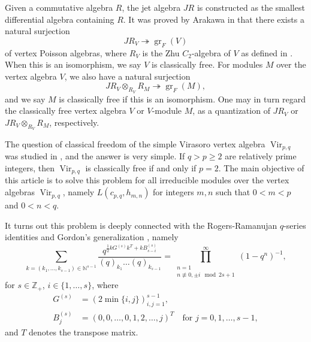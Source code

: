 \documentclass[a4paper, 12pt, reqno]{amsart}
\theoremstyle{remark}
\DeclareMathOperator{\Vir}{Vir}
\DeclareMathOperator{\gr}{gr}
\begin{document}
Given a commutative algebra $R$, the jet algebra $JR$ is constructed as the smallest differential algebra containing $R$.
It was proved by Arakawa in \cite[Proposition 2.5.1]{arakawa_remark_2012} that there exists a natural surjection
\begin{equation*}
  JR_V \twoheadrightarrow \gr_F(V)
\end{equation*}
of vertex Poisson algebras, where $R_V$ is the Zhu $C_2$-algebra of $V$ as defined in \cite{zhu_modular_1996}.
When this is an isomorphism, we say $V$ is classically free.
For modules $M$ over the vertex algebra $V$, we also have a natural surjection
\begin{equation*}
  JR_V \otimes_{R_V} R_M \twoheadrightarrow \gr_F(M),
\end{equation*}
and we say $M$ is classically free if this is an isomorphism.
One may in turn regard the classically free vertex algebra $V$ or $V$-module $M$, as a quantization of $JR_V$ or $JR_V \otimes_{R_V} R_M$, respectively.

The question of classical freedom of the simple Virasoro vertex algebra $\Vir_{p, q}$ was studied in \cite{van_ekeren_chiral_2021}, and the answer is very simple.
If $q > p \ge 2$ are relatively prime integers, then $\Vir_{p, q}$ is classically free if and only if $p = 2$.
The main objective of this article is to solve this problem for all irreducible modules over the vertex algebras $\Vir_{p, q}$, namely $L(c_{p, q}, h_{m, n})$ for integers $m, n$ such that $0 < m < p$ and $0 < n < q$.

It turns out this problem is deeply connected with the Rogers-Ramanujan $q$-series identities and Gordon's generalization \cite{gordon_combinatorial_1961}, namely
\begin{equation}
  \label{eq:1}
  \sum_{k = (k_1, \dots, k_{s - 1}) \in \mathbb{N}^{s - 1}}  \frac{q^{\frac{1}{2}kG^{(s)}k^T + kB^{(s)}_{s - i}}}{(q)_{k_1}\dots(q)_{k_{s - 1}}} = \prod^{\infty}_{\substack{n = 1 \\ n \not\equiv 0, \pm i \mod 2s + 1}}(1 - q^n)^{-1},
\end{equation}
for $s \in \mathbb{Z}_+$, $i \in \{1, \dots, s\}$, where
\begin{align*}
  G^{(s)} &= (2\min\{i, j\})_{i, j = 1}^{s - 1}, \\
  B^{(s)}_j &= (0, 0, \dots, 0, 1, 2, \dots, j)^T \quad \text{for $j = 0, 1, \dots, s - 1$},
\end{align*}
and $T$ denotes the transpose matrix.
\end{document}
